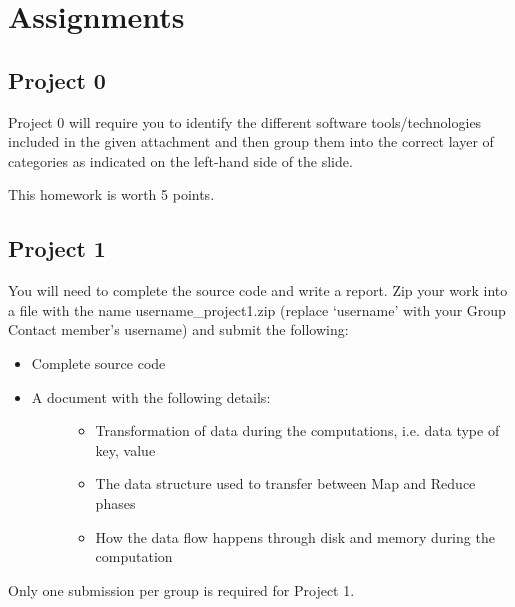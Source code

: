 \part{Assignments}\label{assignments}

\chapter{Project 0}\label{assignment-0}

Project 0 will require you to identify the different software
tools/technologies included in the given attachment and then group them
into the correct layer of categories as indicated on the left-hand side
of the slide.

This homework is worth 5 points.


\chapter{Project 1}\label{project-1}

You will need to complete the source code and write a report. Zip your
work into a file with the name username\_project1.zip (replace
`username' with your Group Contact member's username) and submit the
following:

\begin{itemize}
\item
  Complete source code
\item
  \begin{description}
  \item[A document with the following details:]
  \begin{itemize}
  \tightlist
  \item
    Transformation of data during the computations, i.e. data type of
    key, value
  \item
    The data structure used to transfer between Map and Reduce phases
  \item
    How the data flow happens through disk and memory during the
    computation
  \end{itemize}
  \end{description}
\end{itemize}

Only one submission per group is required for Project 1. 
\iffalse
It is due time at 11:59 pm on Feburary 5.
\fi



